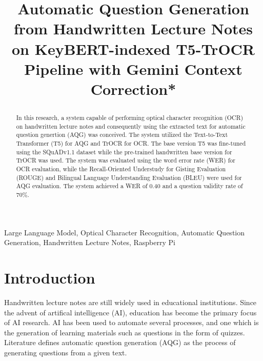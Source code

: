 \documentclass[conference]{IEEEtran}
\begin{document}
\title{Automatic Question Generation from Handwritten Lecture Notes on
KeyBERT-indexed T5-TrOCR Pipeline with Gemini Context Correction*\\
\author{
}
}

\maketitle

\begin{abstract}
In this research, a system capable of performing optical character recognition
(OCR) on handwritten lecture notes and consequently using the extracted text for
automatic question genertion (AQG) was conceived. The system utilized the Text-to-Text
Transformer (T5) for AQG and TrOCR for OCR. The base version T5 was fine-tuned
using the SQuADv1.1 dataset while the pre-trained handwritten base version for
TrOCR was used. The system was evaluated using the word error rate (WER) for
OCR evaluation, while the Recall-Oriented Understudy for Gisting Evaluation (ROUGE)
and Bilingual Language Understanding Evaluation (BLEU) were used for AQG evaluation. 
The system achieved a WER of 0.40 and a question validity rate of 70\%.
\end{abstract}

\begin{IEEEkeywords}
Large Language Model, Optical Character Recognition,
Automatic Question Generation, Handwritten Lecture Notes, Raspberry Pi
\end{IEEEkeywords}

\section{Introduction}
Handwritten lecture notes are still widely used in educational institutions.
Since the advent of artifical intelligence (AI), education has become
the primary focus of AI research. AI has been used to automate several processes,
and one which is the generation of learning materials such as questions in the
form of quizzes. Literature defines automatic question generation (AQG) as the
process of generating questions from a given text. 
\end{document}
